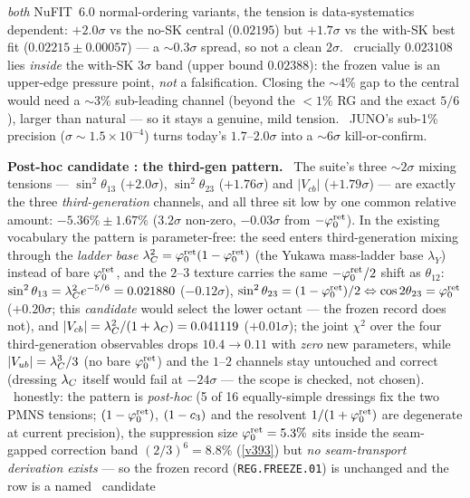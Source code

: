 \emph{both} NuFIT~6.0 normal-ordering variants, the tension is data-systematics dependent: $+2.0\sigma$ vs the
no-SK central ($0.02195$) but $+1.7\sigma$ vs the with-SK best fit ($0.02215\pm0.00057$) --- a ${\sim}0.3\sigma$
spread, so not a clean $2\sigma$. \mE\ crucially $0.023108$ lies \emph{inside} the with-SK $3\sigma$ band (upper
bound $0.02388$): the frozen value is an upper-edge pressure point, \emph{not} a falsification. Closing the
${\sim}4\%$ gap to the central would need a ${\sim}3\%$ sub-leading channel (beyond the $<1\%$ RG and the exact
$5/6$), larger than natural --- so it stays a genuine, mild tension. \mX\ JUNO's sub-1\% precision
($\sigma\!\sim\!1.5{\times}10^{-4}$) turns today's $1.7$--$2.0\sigma$ into a ${\sim}6\sigma$ kill-or-confirm.
\par\smallskip\noindent\textbf{Post-hoc candidate \mO: the third-gen pattern.}
\
The suite's three ${\sim}2\sigma$ mixing tensions --- $\sin^2\theta_{13}$ ($+2.0\sigma$), $\sin^2\theta_{23}$
($+1.76\sigma$) and $|V_{cb}|$ ($+1.79\sigma$) --- are exactly the three \emph{third-generation} channels, and all
three sit low by one common relative amount: $-5.36\%\pm1.67\%$ ($3.2\sigma$ non-zero, $-0.03\sigma$ from $-\varphi_0^{\mathrm{ret}}$).
In the existing vocabulary the pattern is parameter-free: the seed enters third-generation mixing through the
\emph{ladder base} $\lambda_C^2=\varphi_0^{\mathrm{ret}}(1-\varphi_0^{\mathrm{ret}})$ (the Yukawa mass-ladder base $\lambda_Y$) instead of bare $\varphi_0^{\mathrm{ret}}$, and
the $2$--$3$ texture carries the same $-\varphi_0^{\mathrm{ret}}/2$ shift as $\theta_{12}$: $\sin^2\theta_{13}=\lambda_C^2 e^{-5/6}=0.021880$
($-0.12\sigma$), $\sin^2\theta_{23}=(1-\varphi_0^{\mathrm{ret}})/2\Leftrightarrow\cos2\theta_{23}=\varphi_0^{\mathrm{ret}}$ ($+0.20\sigma$; this
\emph{candidate} would select the lower octant --- the frozen record does not), and $|V_{cb}|=\lambda_C^2/(1+\lambda_C)=0.041119$
($+0.01\sigma$); the joint $\chi^2$ over the four third-generation observables drops $10.4\to0.11$ with \emph{zero}
new parameters, while $|V_{ub}|=\lambda_C^3/3$ (no bare $\varphi_0^{\mathrm{ret}}$) and the $1$--$2$ channels stay untouched and correct
(dressing $\lambda_C$ itself would fail at $-24\sigma$ --- the scope is checked, not chosen). \mC\ honestly: the pattern
is \emph{post-hoc} (5 of 16 equally-simple dressings fix the two PMNS tensions; $(1-\varphi_0^{\mathrm{ret}})$, $(1-c_3)$ and the
resolvent $1/(1+\varphi_0^{\mathrm{ret}})$ are degenerate at current precision), the suppression size $\varphi_0^{\mathrm{ret}}=5.3\%$ sits inside the
seam-gapped correction band $(2/3)^6=8.8\%$ (\vref{v393}) but \emph{no seam-transport derivation exists} --- so the
frozen record (\texttt{REG.FREEZE.01}) is unchanged and the row is a named \mO\ candidate
